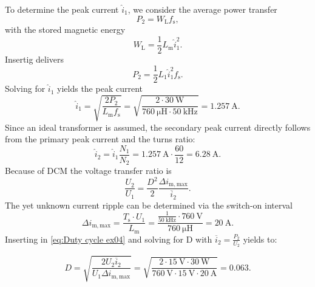 \begin{solutionblock}
To determine the peak current  $\hat i_\mathrm{1}$, we consider the average power transfer
\begin{equation}
    P_\mathrm{2} = W_\mathrm{L} f_\mathrm{s}, \label{eq:output power ex04}
\end{equation}
with the stored magnetic energy
\begin{equation}
    W_\mathrm{L} = \frac{1}{2}L_\mathrm{m}\hat i_\mathrm{1}^2. \label{eq:energy primary inductance ex04}
\end{equation}
Insertig delivers
\begin{equation}
    P_\mathrm{2} = \frac{1}{2}L_\mathrm{1}\hat i_\mathrm{1}^2 f_\mathrm{s}.\label{eq:output power with IDach ex04}
\end{equation}
Solving for $\hat i_\mathrm{1}$ yields the peak current
\begin{equation}
    \hat i_\mathrm{1} = \sqrt{\frac{2P_\mathrm{2}}{L_\mathrm{m}f_\mathrm{s}}}= \sqrt{\frac{2\cdot\SI{30}{\watt}}{\SI{760}{\micro\henry}\cdot\SI{50}{\kilo\hertz}}}=\SI{1.257}{\ampere}.
\end{equation}
Since an ideal transformer is assumed, the secondary peak current directly follows from the primary peak current and the turns ratio:
\begin{equation}
    \hat i_\mathrm{2} = \hat i_\mathrm{1} \frac{N_\mathrm{1}}{N_\mathrm{2}} = \SI{1.257}{\ampere} \cdot \frac{60}{12} = \SI{6.28}{\ampere}.
\end{equation}
Because of DCM the voltage transfer ratio is
\begin{equation}
    \frac{U_2}{U_1} = \frac{D^2}{2} \frac{\Delta i_\mathrm{m,max}}{\overline{i}_2}. \label{eq:Duty cycle ex04}
\end{equation}
The yet unknown current ripple can be determined via the switch-on interval
\begin{equation}
    \Delta i_\mathrm{m,max}= \frac{T_\mathrm{s} \cdot U_1}{L_\mathrm{m}} = \frac{\frac{1}{\SI{50}{\kilo\hertz}}\cdot \SI{760}{\volt}}{\SI{760}{\micro\henry}}=\SI{20}{\ampere}.
\end{equation}
Inserting in \eqref{eq:Duty cycle ex04} and solving for D with $\overline{i}_2 = \frac{P_\mathrm{2}}{U_\mathrm{2}}$ yields to:

\begin{equation}
    D = \sqrt{\frac{2U_2\overline{i}_2}{U_1\Delta i_\mathrm{m,max}}} = \sqrt{\frac{2\cdot \SI{15}{\volt}\cdot\SI{30}{\watt}}{\SI{760}{\volt}\cdot\SI{15}{\volt}\cdot\SI{20}{\ampere}}} = 0.063.
\end{equation}

\end{solutionblock}

